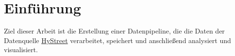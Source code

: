 \section{Einführung}
Ziel dieser Arbeit ist die Erstellung einer Datenpipeline, die die Daten der Datenquelle \href{https://hystreet.com}{HyStreet} verarbeitet, speichert und anschließend analysiert und visualisiert.
